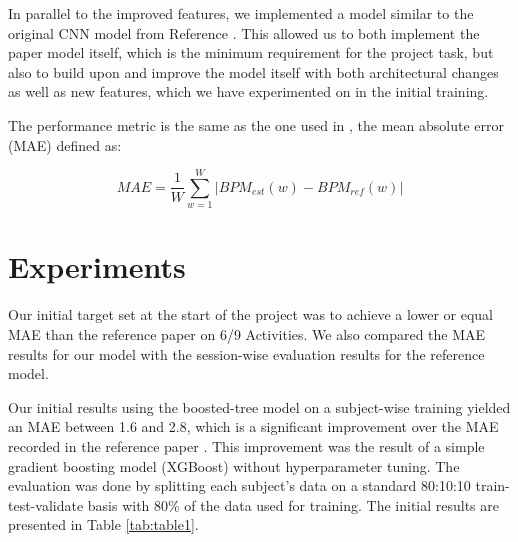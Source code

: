 \documentclass[12pt, conference]{IEEEtran}
\begin{document}
In parallel to the improved features, we implemented a model similar to the original CNN model from Reference \cite{reiss2019deep}. This allowed us to both implement the paper model itself, which is the minimum requirement for the project task, but also to build upon and improve the model itself with both architectural changes as well as new features, which we have experimented on in the initial training.

The performance metric is the same as the one used in \cite{reiss2019deep}, the mean absolute error (MAE) defined as:

\begin{equation}
	MAE=\frac{1}{W} \sum_{w=1}^{W} \lvert BPM_{est}(w)-BPM_{ref}(w) \rvert
\end{equation}

\section{Experiments}

Our initial target set at the start of the project was to achieve a lower or equal MAE than the reference paper \cite{reiss2019deep} on 6/9 Activities. We also compared the MAE results for our model with the session-wise evaluation results for the reference model.

Our initial results using the boosted-tree model on a subject-wise training yielded an MAE between 1.6 and 2.8, which is a significant improvement over the MAE recorded in the reference paper \cite{reiss2019deep}.  This improvement was the result of a simple gradient boosting model (XGBoost) without hyperparameter tuning. The evaluation was done by splitting each subject’s data on a standard 80:10:10 train-test-validate basis with 80\% of the data used for training. The initial results are presented in Table \ref{tab:table1}.
\end{document}
